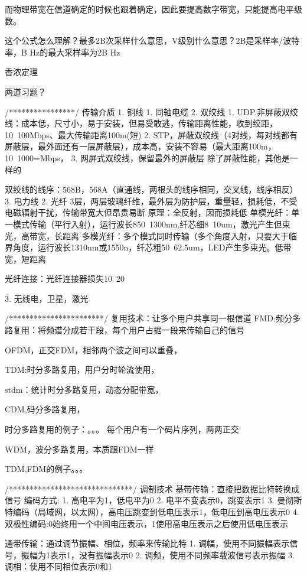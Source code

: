 \documentclass[UTF8,a4paper]{ctexart}
\begin{document}
而物理带宽在信道确定的时候也跟着确定，因此要提高数字带宽，只能提高电平级数。

{这个公式怎么理解？最多2B次采样什么意思，V级别什么意思？2B是采样率/波特率，B Hz的最大采样率为2B Hz}

香浓定理

两道习题？

/****************/
传输介质
1. 铜线
	1. 同轴电缆
	2. 双绞线
		1. UDP.非屏蔽双绞线：成本低，尺寸小，易于安装，但易受敢逃，传输距离性能，收到绞距，10~100Mbps、最大传输距离100m(短)
		2. STP，屏蔽双绞线（4对线，每对线都有屏蔽层，最外面还有一层屏蔽层），成本高，安装不容易（最大距离100m，10~1000=Mbps，
		3. 网屏式双绞线，保留最外的屏蔽层
		除了屏蔽性能，其他是一样的

		双绞线的线序：568B，568A（直通线，两根头的线序相同，交叉线，线序相反）
	3. 电力线
2. 光纤
	3层，两层玻璃纤维，最外层为防护层，重量轻，损耗低，不受电磁辐射干扰，传输带宽大但昂贵易断
	原理：全反射，因而损耗低
	单模光纤：单一模式传输（平行入射），运行波长850~1300nm,纤芯细8~10um，激光产生但束光，高带宽，长距离
	多模光纤：多个模式同时传输（多个角度入射，只要大于临界角度，运行波长1310nm或1550n，纤芯粗50~62.5um，LED产生多束光。低带宽，短距离

	光纤连接：光纤连接器损失10~20%

3. 无线电，卫星，激光

/***********************/
复用技术：让多个用户共享同一根信道
FMD:频分多路复用：将频谱分成若干段，每个用户占据一段来传输自己的信号

OFDM，正交FDM，相邻两个波之间可以重叠，

TDM:时分多路复用，用户分时轮流使用，

stdm：统计时分多路复用，动态分配带宽，

CDM,码分多路复用，

时分多路复用的例子：。。。
每个用户有一个码片序列，两两正交

WDM，波分多路复用，本质跟FDM一样

TDM,FDM的例子。。。

/******************************/
调制技术
基带传输：直接把数据比特转换成信号
编码方式:
1. 高电平为1，低电平为0
2. 电平不变表示0，跳变表示1
3. 曼彻斯特编码（局域网，以太网），高电压跳变到低电压表示1，低电压到高电压表示0
4. 双极性编码:0始终用一个中间电压表示，1使用高电压表示之后使用低电压表示

通带传输：通过调节振幅、相位，频率来传输比特
1. 调幅，使用不同振幅表示信号，振幅为1表示1，没有振幅表示0
2. 调频，使用不同频率载波信号表示振幅
3. 调相：使用不同相位表示0和1
\end{document}
